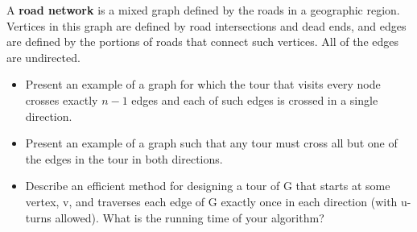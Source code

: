 \documentclass{common/cs157}
\begin{document}
\homeworkhandin %








\begin{problem}{1}
A \textbf{road network} is a mixed graph defined by the roads in a geographic region.
Vertices in this graph are defined by road intersections and dead ends, and edges
are defined by the portions of roads that connect such vertices. All of the edges are undirected.

\begin{itemize}
\item Present an example of a graph for which the tour that visits every node crosses exactly $n-1$ edges and each of such edges is crossed in a single direction.
\item Present an example of a graph such that any tour must cross all but one of the edges in the tour in both directions. 
    \item Describe an efficient method for designing a tour of G that starts at some vertex, v, and traverses each edge of G exactly once in each direction (with u-turns allowed). What is the running time of your algorithm? 
\end{itemize}


\end{problem}


\end{document}
